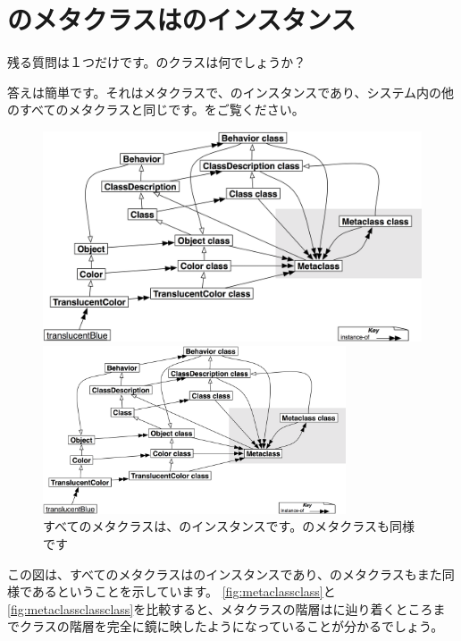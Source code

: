 \documentclass[a4paper,10pt,twoside]{book}
\begin{document}
\section{のメタクラスはのインスタンス}

残る質問は１つだけです。のクラスは何でしょうか？

答えは簡単です。それはメタクラスで、のインスタンスであり、システム内の他のすべてのメタクラスと同じです。をご覧ください。

\begin{center}
\begin{figure}
\ifluluelse
	{\centerline{\includegraphics[width=\textwidth]{TranslucentMetaclassClassClass}}}
	{\centerline{\includegraphics[width=0.8\textwidth]{TranslucentMetaclassClassClass}}}
\caption{すべてのメタクラスは、のインスタンスです。のメタクラスも同様です}
\end{figure}
\end{center}

この図は、すべてのメタクラスはのインスタンスであり、のメタクラスもまた同様であるということを示しています。
\ref{fig:metaclassclass}と\ref{fig:metaclassclassclass}を比較すると、メタクラスの階層はに辿り着くところまでクラスの階層を完全に鏡に映したようになっていることが分かるでしょう。
\end{document}
